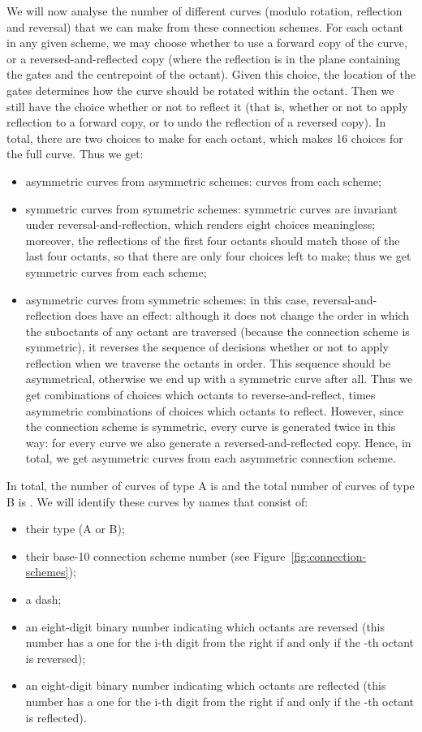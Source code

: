 \documentclass[11pt,a4paper]{article}
\begin{document}
We will now analyse the number of different curves (modulo rotation, reflection and reversal) that we can make from these connection schemes. For each octant in any given scheme, we may choose whether to use a forward copy of the curve, or a reversed-and-reflected copy (where the reflection is in the plane containing the gates and the centrepoint of the octant). Given this choice, the location of the gates determines how the curve should be rotated within the octant. Then we still have the choice whether or not to reflect it (that is, whether or not to apply reflection to a forward copy, or to undo the reflection of a reversed copy). In total, there are two choices to make for each octant, which makes 16 choices for the full curve. Thus we get:\begin{itemize}
\item asymmetric curves from asymmetric schemes:  curves from each scheme;
\item symmetric curves from symmetric schemes: symmetric curves are invariant under reversal-and-reflection, which renders eight choices meaningless; moreover, the reflections of the first four octants should match those of the last four octants, so that there are only four choices left to make; thus we get  symmetric curves from each scheme;
\item asymmetric curves from symmetric schemes: in this case, reversal-and-reflection does have an effect: although it does not change the order in which the suboctants of any octant are traversed (because the connection scheme is symmetric), it reverses the sequence of decisions whether or not to apply reflection when we traverse the octants in order. This sequence should be asymmetrical, otherwise we end up with a symmetric curve after all. Thus we get  combinations of choices which octants to reverse-and-reflect, times  asymmetric combinations of choices which octants to reflect. However, since the connection scheme is symmetric, every curve is generated twice in this way: for every curve we also generate a reversed-and-reflected copy. Hence, in total, we get  asymmetric curves from each asymmetric connection scheme.
\end{itemize}
\label{sec:OmHnumbering}
In total, the number of curves of type A is  and the total number of curves of type B is .
We will identify these curves by names that consist of:\begin{itemize}
\item their type (A or B);
\item their base-10 connection scheme number (see Figure~\ref{fig:connection-schemes});
\item a dash;
\item an eight-digit binary number indicating which octants are reversed (this number has a one for the i-th digit from the right if and only if the -th octant is reversed);
\item an eight-digit binary number indicating which octants are reflected (this number has a one for the i-th digit from the right if and only if the -th octant is reflected).
\end{itemize}
\end{document}
